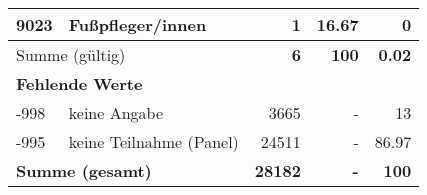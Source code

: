 \begin{longtable}{lXrrr}
     9023 &
     \multicolumn{1}{X}{ Fußpfleger/innen   } &


       \num{1} &
       \num[round-mode=places,round-precision=2]{16.67} &
         \num[round-mode=places,round-precision=2]{0} \\
     \midrule
     \multicolumn{2}{l}{Summe (gültig)} &
       \textbf{\num{6}} &
     \textbf{\num{100}} &
       \textbf{\num[round-mode=places,round-precision=2]{0.02}} \\
     \multicolumn{5}{l}{\textbf{Fehlende Werte}}\\
       -998 &
       keine Angabe &
         \num{3665} &
        - &
         \num[round-mode=places,round-precision=2]{13} \\
       -995 &
       keine Teilnahme (Panel) &
         \num{24511} &
        - &
         \num[round-mode=places,round-precision=2]{86.97} \\
     \midrule
     \multicolumn{2}{l}{\textbf{Summe (gesamt)}} &
          \textbf{\num{28182}} &
        \textbf{-} &
        \textbf{\num{100}} \\
     \bottomrule
     \end{longtable}
     
